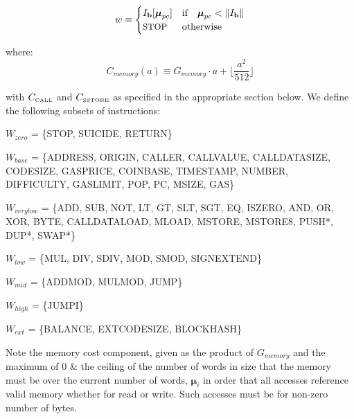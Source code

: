 \documentclass[9pt,oneside]{amsart}
\begin{document}
\begin{equation}
w \equiv \begin{cases} I_\mathbf{b}[\boldsymbol{\mu}_{pc}] & \text{if} \quad \boldsymbol{\mu}_{pc} < \lVert I_\mathbf{b} \rVert\\
\text{\small STOP} & \text{otherwise}
\end{cases}
\end{equation}

where:
\begin{equation}
C_{memory}(a) \equiv G_{memory} \cdot a + \Big\lfloor \dfrac{a^2}{512} \Big\rfloor
\end{equation}

with $C_\text{\tiny CALL}$ and $C_\text{\tiny SSTORE}$ as specified in the appropriate section below. We define the following subsets of instructions:

$W_{zero}$ = \{{\small STOP}, {\small SUICIDE}, {\small RETURN}\}

$W_{base}$ = \{{\small ADDRESS}, {\small ORIGIN}, {\small CALLER}, {\small CALLVALUE}, {\small CALLDATASIZE}, {\small CODESIZE}, {\small GASPRICE}, {\small COINBASE},\newline \noindent\hspace*{1cm} {\small TIMESTAMP}, {\small NUMBER}, {\small DIFFICULTY}, {\small GASLIMIT}, {\small POP}, {\small PC}, {\small MSIZE}, {\small GAS}\}

$W_{verylow}$ = \{{\small ADD}, {\small SUB}, {\small NOT}, {\small LT}, {\small GT}, {\small SLT}, {\small SGT}, {\small EQ}, {\small ISZERO}, {\small AND}, {\small OR}, {\small XOR}, {\small BYTE}, {\small CALLDATALOAD}, \newline \noindent\hspace*{1cm} {\small MLOAD}, {\small MSTORE}, {\small MSTORE8}, {\small PUSH*}, {\small DUP*}, {\small SWAP*}\}

$W_{low}$ = \{{\small MUL}, {\small DIV}, {\small SDIV}, {\small MOD}, {\small SMOD}, {\small SIGNEXTEND}\}

$W_{mid}$ = \{{\small ADDMOD}, {\small MULMOD}, {\small JUMP}\}

$W_{high}$ = \{{\small JUMPI}\}

$W_{ext}$ = \{{\small BALANCE}, {\small EXTCODESIZE}, {\small BLOCKHASH}\}

Note the memory cost component, given as the product of $G_{memory}$ and the maximum of 0 \& the ceiling of the number of words in size that the memory must be over the current number of words, $\boldsymbol{\mu}_i$ in order that all accesses reference valid memory whether for read or write. Such accesses must be for non-zero number of bytes.
\end{document}

